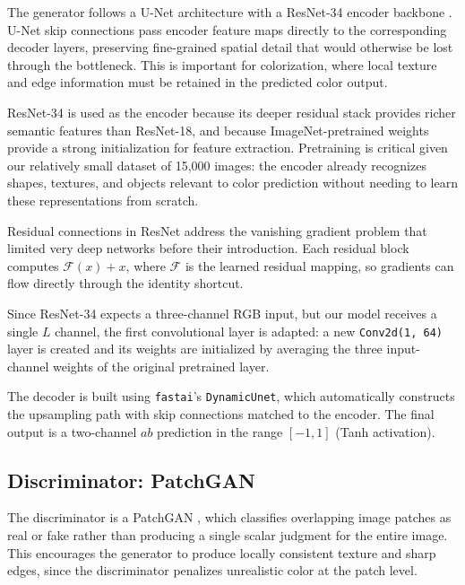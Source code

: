 \documentclass[12pt, a4paper, oneside]{report}
\begin{document}
    The generator follows a U-Net architecture \cite{ronneberger2015u} with a
    ResNet-34 encoder backbone \cite{he2016deep}. U-Net skip connections pass
    encoder feature maps directly to the corresponding decoder layers, preserving
    fine-grained spatial detail that would otherwise be lost through the bottleneck.
    This is important for colorization, where local texture and edge information
    must be retained in the predicted color output.

    ResNet-34 is used as the encoder because its deeper residual stack provides
    richer semantic features than ResNet-18, and because ImageNet-pretrained weights
    provide a strong initialization for feature extraction. Pretraining is critical
    given our relatively small dataset of 15,000 images: the encoder already
    recognizes shapes, textures, and objects relevant to color prediction without
    needing to learn these representations from scratch.

    Residual connections in ResNet address the vanishing gradient problem that
    limited very deep networks before their introduction. Each residual block
    computes $\mathcal{F}(x) + x$, where $\mathcal{F}$ is the learned residual
    mapping, so gradients can flow directly through the identity shortcut.

    Since ResNet-34 expects a three-channel RGB input, but our model receives a
    single $L$ channel, the first convolutional layer is adapted: a new
    \texttt{Conv2d(1, 64)} layer is created and its weights are initialized by
    averaging the three input-channel weights of the original pretrained layer.

    The decoder is built using \texttt{fastai}'s \texttt{DynamicUnet}, which
    automatically constructs the upsampling path with skip connections matched to
    the encoder. The final output is a two-channel $ab$ prediction in the range
    $[-1, 1]$ (Tanh activation).

    \subsection{Discriminator: PatchGAN}

    The discriminator is a PatchGAN \cite{isola2017image}, which classifies
    overlapping image patches as real or fake rather than producing a single scalar
    judgment for the entire image. This encourages the generator to produce locally
    consistent texture and sharp edges, since the discriminator penalizes unrealistic
    color at the patch level.
\end{document}
